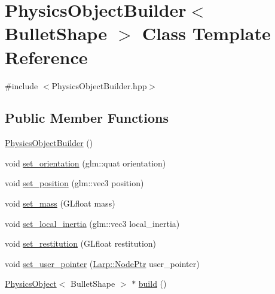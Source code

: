 \hypertarget{classPhysicsObjectBuilder}{}\section{Physics\+Object\+Builder$<$ Bullet\+Shape $>$ Class Template Reference}
\label{classPhysicsObjectBuilder}


{\ttfamily \#include $<$Physics\+Object\+Builder.\+hpp$>$}

\subsection*{Public Member Functions}
\begin{DoxyCompactItemize}
\item 
\hyperlink{classPhysicsObjectBuilder_a7643a50273d8bc9f35445d737f6bbbd7}{Physics\+Object\+Builder} ()
\item 
void \hyperlink{classPhysicsObjectBuilder_aaac658742fa2404fc252d5d769745442}{set\+\_\+orientation} (glm\+::quat orientation)
\item 
void \hyperlink{classPhysicsObjectBuilder_ad3ec72085f235c3f2099d349954ffa61}{set\+\_\+position} (glm\+::vec3 position)
\item 
void \hyperlink{classPhysicsObjectBuilder_a00d22a66a0b763ff480c9d0ce472f2a1}{set\+\_\+mass} (G\+Lfloat mass)
\item 
void \hyperlink{classPhysicsObjectBuilder_a9e7a8e1b775077f30109d89a1a842092}{set\+\_\+local\+\_\+inertia} (glm\+::vec3 local\+\_\+inertia)
\item 
void \hyperlink{classPhysicsObjectBuilder_a2ef538015ea6cc911a322ca32167a4e8}{set\+\_\+restitution} (G\+Lfloat restitution)
\item 
void \hyperlink{classPhysicsObjectBuilder_a58cf14b9022621049a79f4095c3e70e2}{set\+\_\+user\+\_\+pointer} (\hyperlink{namespaceLarp_a171c1dc8b70cfb441b15d7386780db23}{Larp\+::\+Node\+Ptr} user\+\_\+pointer)
\item 
\hyperlink{classPhysicsObject}{Physics\+Object}$<$ Bullet\+Shape $>$ $\ast$ \hyperlink{classPhysicsObjectBuilder_ae482a7d48205dd69ae8d750c60ea96ce}{build} ()
\end{DoxyCompactItemize}

